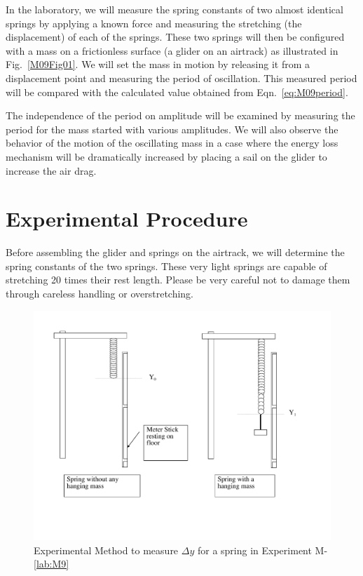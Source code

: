 In the laboratory, we will measure the spring constants of two almost identical springs by applying a known force and measuring the stretching (the displacement) of each of the springs.  These two springs will then be configured with a mass on a frictionless surface (a glider on an airtrack) as illustrated in Fig.~\ref{M09Fig01}.  We will set the mass in motion by releasing it from a displacement point and measuring the period of oscillation.  This measured period will be compared with the calculated value obtained from Eqn.~\ref{eq:M09period}.

The independence of the period on amplitude will be examined by measuring the period for the mass started with various amplitudes.  We will also observe the behavior of the motion of the oscillating mass in a case where the energy loss mechanism will be dramatically increased by placing a sail on the glider to increase the air drag.


\pagebreak

\section{Experimental Procedure}

Before assembling the glider and springs on the airtrack, we will determine the spring constants of the two springs.  These very light springs are capable of stretching 20 times their rest length.  Please be very careful not to damage them through careless handling or overstretching.

\begin{figure}
  \centering
  \includegraphics[width=6.0in]{Experiment07Figures/Figure02.pdf}
  \caption{Experimental Method to measure $\Delta y$ for a spring in Experiment M-\ref{lab:M9}}
  \label{M09Fig02}
\end{figure}

